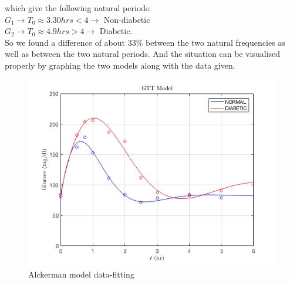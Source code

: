 which give the following natural periods:\\

$G_{1} \longrightarrow T_{0} \approx 3.30 hrs < 4 \rightarrow$ Non-diabetic \\
$G_{2} \longrightarrow T_{0} \approx 4.9 hrs > 4 \rightarrow$ Diabetic.\\

So we found a difference of about 33\% between the two natural frequencies as well as between the two natural periods. And the situation can be visualised properly by graphing the two models along with the data given.

\begin{figure}[H]
	\centering
	\includegraphics[scale=0.6]{DIABETES_Prob1.jpg}
	\caption{Alckerman model data-fitting}
\end{figure}

